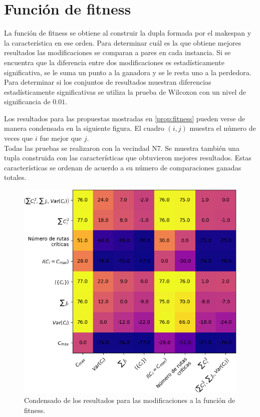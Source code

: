 \section{Función de fitness}
  La función de fitness se obtiene al construir la dupla formada por el makespan y la característica en ese orden. Para determinar cuál es la que obtiene mejores resultados las modificaciones se comparan a pares en cada instancia. Si se encuentra que la diferencia entre dos modificaciones es estadísticamente significativa, se le suma un punto a la ganadora y se le resta uno a la perdedora.
Para determinar si los conjuntos de resultados muestran diferencias estadísticamente significativas se utiliza la prueba de Wilcoxon con un nivel de significancia de $0.01$. 

Los resultados para las propuestas mostradas en \ref{prop:fitness} pueden verse de manera condensada en la siguiente figura. El cuadro $(i,j)$ muestra el número de veces que $i$ fue mejor que $j$.\\
Todas las pruebas se realizaron con la vecindad N7. Se muestra también una tupla construida con las características que obtuvieron mejores resultados. Estas características se ordenan de acuerdo a su número de comparaciones ganadas totales.
\begin{figure}[H]
    \centering
    \includegraphics[scale=.8]{Imagenes/fitnesscomp.png}
    \caption{Condensado de los resultados para las modificaciones a la función de fitness. }
\end{figure}

